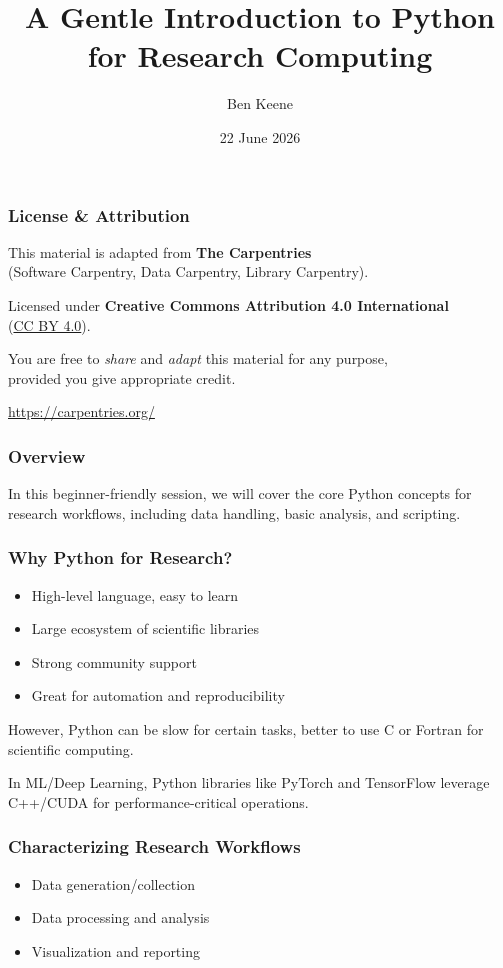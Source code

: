 \documentclass{beamer}
\title{A Gentle Introduction to Python for Research Computing}
\author{Ben Keene}
\institute{University of Central Florida}
\date{22 June 2026}
\begin{document}
\frame{\titlepage}

\begin{frame}
    \frametitle{License \& Attribution}
    \begin{center}
        This material is adapted from \textbf{The Carpentries}\\
        (Software Carpentry, Data Carpentry, Library Carpentry).

        \bigskip

        Licensed under \textbf{Creative Commons Attribution 4.0 International}\\
        (\href{https://creativecommons.org/licenses/by/4.0/}{CC BY 4.0}).

        \bigskip

        You are free to \emph{share} and \emph{adapt} this material for any purpose,\\
        provided you give appropriate credit.

        \bigskip

        \small \url{https://carpentries.org/}
    \end{center}
\end{frame}

\begin{frame}
    \frametitle{Overview}
    In this beginner-friendly session, we will cover the core Python concepts for research workflows, including data handling, basic analysis, and scripting.
\end{frame}

\begin{frame}
    \frametitle{Why Python for Research?}
    \begin{itemize}
        \item High-level language, easy to learn
        \item Large ecosystem of scientific libraries
        \item Strong community support
        \item Great for automation and reproducibility
    \end{itemize}

    \bigskip

    However, Python can be slow for certain tasks, better to use C or Fortran for scientific computing.

    \bigskip

    In ML/Deep Learning, Python libraries like PyTorch and TensorFlow leverage C++/CUDA for performance-critical operations.
\end{frame}
\begin{frame}
    \frametitle{Characterizing Research Workflows}
    \begin{itemize}
        \item Data generation/collection
        \item Data processing and analysis
        \item Visualization and reporting
    \end{itemize}
\end{frame}
\end{document}

